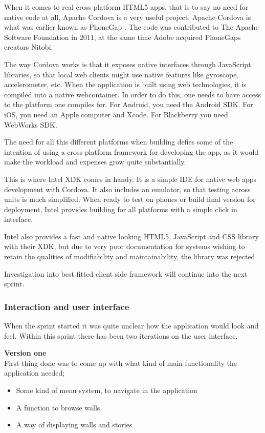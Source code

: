 \documentclass[11pt]{book}
\begin{document}
When it comes to real cross platform HTML5 apps, that is to say no need for native code at all, Apache Cordova is a very useful project. Apache Cordova is what was earlier known as PhoneGap \cite{phonegap}. The code was contributed to The Apache Software Foundation in 2011, at the same time Adobe acquired PhoneGaps creators Nitobi.

The way Cordova works is that it exposes native interfaces through JavaScript libraries, so that local web clients might use native features like gyroscope, accelerometer, etc. When the application is built using web technologies, it is compiled into a native webcontainer. In order to do this, one needs to have access to the platform one compiles for. For Android, you need the Android SDK. For iOS, you need an Apple computer and Xcode. For Blackberry you need WebWorks SDK.

The need for all this different platforms when building defies some of the intention of using a cross platform framework for developing the app, as it would make the workload and expenses grow quite substantially.

This is where Intel XDK comes in handy. It is a simple IDE for native web apps development with Cordova. It also includes an emulator, so that testing across units is much simplified. When ready to test on phones or build final version for deployment, Intel provides building for all platforms with a simple click in interface.

Intel also provides a fast and native looking HTML5, JavaScript and CSS library with their XDK, but due to very poor documentation for systems wishing to retain the qualities of modifiability and maintainability, the library was rejected.

Investigation into best fitted client side framework will continue into the next sprint.

\subsubsection{Interaction and user interface}
When the sprint started it was quite unclear how the application would look and feel. Within this sprint there has been two iterations on the user interface.

\textbf{Version one}\\
First thing done was to come up with what kind of main functionality the application needed;

\begin{itemize}
	\item Some kind of menu system, to navigate in the application
	\item A function to browse walls
	\item A way of displaying walls and stories
\end{itemize}
\end{document}
